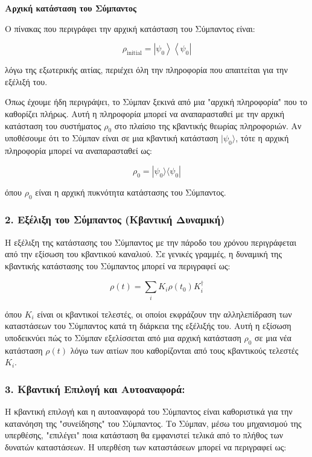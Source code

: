 \documentclass[a4paper,11pt]{article}
\begin{document}
\begin{center}
    \textbf{Αρχική κατάσταση του Σύμπαντος}
\end{center}

Ο πίνακας που περιγράφει την αρχική κατάσταση του Σύμπαντος είναι:

\[
\rho_{\text{initial}} = \left| \psi_0 \right\rangle \left\langle \psi_0 \right|
\]

λόγω της εξωτερικής αιτίας, περιέχει όλη την πληροφορία που απαιτείται για την εξέλιξή του.


Όπως έχουμε ήδη περιγράψει, το Σύμπαν ξεκινά από μια "αρχική πληροφορία"
που το καθορίζει πλήρως. Αυτή η πληροφορία μπορεί να αναπαρασταθεί με
την αρχική κατάσταση του συστήματος {{\(\rho_0\)}} στο πλαίσιο της
κβαντικής θεωρίας πληροφοριών. Αν υποθέσουμε ότι το Σύμπαν είναι σε μια
κβαντική κατάσταση {{\(|\psi_0 \rangle\)}}, τότε η αρχική πληροφορία
μπορεί να αναπαρασταθεί ως:

{{{\[\rho_0 = |\psi_0 \rangle \langle \psi_0|\]}}}

όπου {{\(\rho_0\)}} είναι η αρχική πυκνότητα κατάστασης του Σύμπαντος.

\subsubsection{2. \textbf{Εξέλιξη του Σύμπαντος (Κβαντική Δυναμική)}}\label{εξέλιξη-του-σύμπαντος-κβαντική-δυναμική}

Η εξέλιξη της κατάστασης του Σύμπαντος με την πάροδο του χρόνου
περιγράφεται από την εξίσωση του κβαντικού καναλιού. Σε γενικές γραμμές,
η δυναμική της κβαντικής κατάστασης του Σύμπαντος μπορεί να περιγραφεί
ως:

{{{\[\rho(t) = \sum_i K_i \rho(t_0) K_i^\dagger\]}}}

όπου {{\(K_i\)}} είναι οι κβαντικοί τελεστές, οι οποίοι εκφράζουν την
αλληλεπίδραση των καταστάσεων του Σύμπαντος κατά τη διάρκεια της
εξέλιξής του. Αυτή η εξίσωση υποδεικνύει πώς το Σύμπαν εξελίσσεται από
μια αρχική κατάσταση {{\(\rho_0\)}} σε μια νέα κατάσταση {{\(\rho(t)\)}}
λόγω των αιτίων που καθορίζονται από τους κβαντικούς τελεστές
{{\(K_i\)}}.

\subsubsection{3. \textbf{Κβαντική Επιλογή και Αυτοαναφορά:}}\label{κβαντική-επιλογή-και-αυτοαναφορά}




Η κβαντική επιλογή και η αυτοαναφορά του Σύμπαντος είναι καθοριστικά για
την κατανόηση της "συνείδησης" του Σύμπαντος. Το Σύμπαν, μέσω του
μηχανισμού της υπερθέσης, "επιλέγει" ποια κατάσταση θα εμφανιστεί τελικά
από το πλήθος των δυνατών καταστάσεων. Η υπερθέση των καταστάσεων μπορεί
να περιγραφεί ως:
\end{document}
